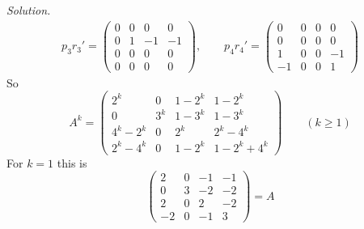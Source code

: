 \documentclass[12pt]{article}
\theoremstyle{definition}
\newenvironment{solution}{\par\noindent\textit{Solution.}\ }{\par\smallskip}
\begin{document}
\begin{solution}
\[\begin{gathered}
p_3r_3'=\begin{pmatrix}0&0&0&0\\0&1&-1&-1\\0&0&0&0\\0&0&0&0\end{pmatrix},\qquad
p_4r_4'=\begin{pmatrix}0&0&0&0\\0&0&0&0\\1&0&0&-1\\-1&0&0&1\end{pmatrix}
\end{gathered}
\]
So
\[
A^k=\begin{pmatrix}2^k&0&1-2^k&1-2^k\\0&3^k&1-3^k&1-3^k\\4^k-2^k&0&2^k&2^k-4^k\\2^k-4^k&0&1-2^k&1-2^k+4^k\end{pmatrix}
\qquad(k\geqslant1)
\]
For \(k=1\) this is
\[
\begin{pmatrix}2&0&-1&-1\\0&3&-2&-2\\2&0&2&-2\\-2&0&-1&3\end{pmatrix}=A
\]
\end{solution}
\end{document}
